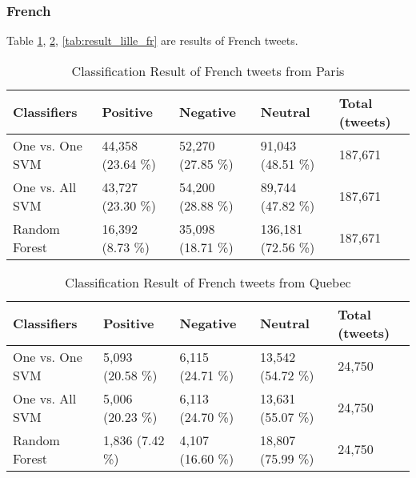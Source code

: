 \begin{comment}

\begin{table}[ht]
	\caption{Classification Result of Quebec}
	\begin{tabular}{|l|p{1.8cm}|p{1.8cm}|p{1.8cm}|p{1.8cm}|} \hline
	Classifiers & Positive & Negative & Neutral & Total (tweets)\\ \hline
	( \%)
	\end{tabular}
	\label{tab:result_quebec_en}
\end{table}


\end{comment}
\clearpage
\subsubsection{French}
Table \ref{tab:result_paris_fr}, \ref{tab:result_quebec_fr}, \ref{tab:result_lille_fr} are results of French tweets.

\begin{table}[ht]
	\caption{Classification Result of French tweets from Paris}
	\begin{tabular}{|l|p{1.8cm}|p{1.8cm}|p{1.8cm}|p{1.8cm}|} \hline
	Classifiers & Positive & Negative & Neutral & Total (tweets)\\ \hline
One vs. One SVM & 44,358 (23.64 \%)& 52,270 (27.85 \%)& 91,043 (48.51 \%) & 187,671 \\ \hline
One vs. All SVM & 43,727 (23.30 \%)& 54,200 (28.88 \%)& 89,744 (47.82 \%) & 187,671 \\ \hline
Random Forest   & 16,392 (8.73 \%)& 35,098 (18.71 \%)& 136,181 (72.56 \%)& 187,671 \\ \hline
	\end{tabular}
	\label{tab:result_paris_fr}
\end{table}

\begin{table}[ht]
	\caption{Classification Result of French tweets from Quebec}
	\begin{tabular}{|l|p{1.8cm}|p{1.8cm}|p{1.8cm}|p{1.8cm}|} \hline
	Classifiers & Positive & Negative & Neutral & Total (tweets)\\ \hline
	
	One vs. One SVM & 5,093 (20.58 \%)& 6,115 (24.71 \%)& 13,542 (54.72 \%)& 24,750 \\ \hline
	One vs. All SVM & 5,006 (20.23 \%)& 6,113 (24.70 \%)& 13,631 (55.07 \%)& 24,750 \\ \hline
	Random Forest   & 1,836 (7.42 \%)& 4,107 (16.60 \%)& 18,807 (75.99 \%)& 24,750 \\ \hline
	\end{tabular}
	\label{tab:result_quebec_fr}
\end{table}

